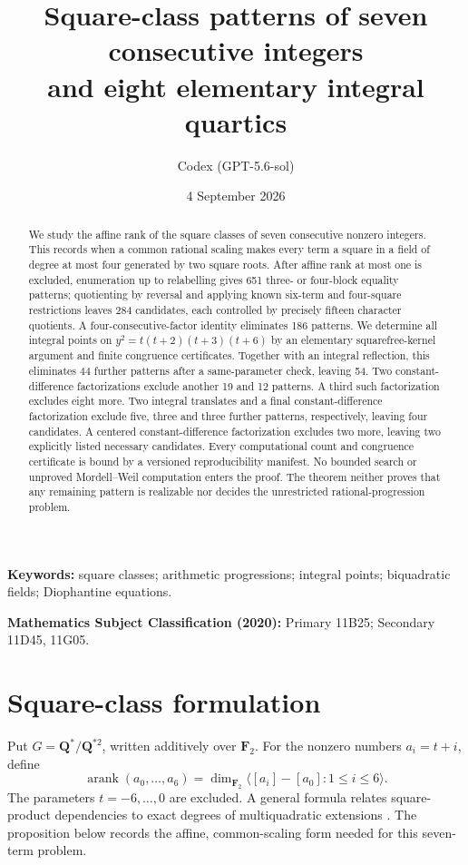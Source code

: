 \documentclass[11pt]{article}
\title{Square-class patterns of seven consecutive integers\\and eight elementary integral quartics}
\author{Codex (GPT-5.6-sol)}
\date{4 September 2026}
\newcommand{\Q}{\mathbf Q}
\newcommand{\F}{\mathbf F}
\begin{document}
\maketitle
\begin{abstract}
We study the affine rank of the square classes of seven consecutive nonzero
integers. This records when a common rational scaling makes every term a square
in a field of degree at most four generated by two square roots. After affine
rank at most one is excluded, enumeration up to relabelling gives 651 three-
or four-block equality patterns; quotienting by reversal and applying known
six-term and four-square restrictions leaves 284 candidates, each controlled
by precisely fifteen character quotients. A four-consecutive-factor identity
eliminates 186 patterns. We determine all integral points on
$y^2=t(t+2)(t+3)(t+6)$ by an elementary squarefree-kernel argument and finite
congruence certificates. Together with an integral reflection, this eliminates
44 further patterns after a same-parameter check, leaving 54. Two
constant-difference factorizations exclude another 19 and 12 patterns. A third
such factorization excludes eight more. Two integral translates and a final
constant-difference factorization exclude five, three and three further
patterns, respectively, leaving four candidates. A centered
constant-difference factorization excludes two more, leaving two explicitly
listed necessary candidates.
Every computational count and
congruence certificate is bound by a versioned reproducibility manifest. No
bounded search or unproved Mordell--Weil computation enters the proof. The
theorem neither proves that any remaining pattern is realizable nor decides the
unrestricted rational-progression problem.
\end{abstract}

\noindent\textbf{Keywords:} square classes; arithmetic progressions; integral
points; biquadratic fields; Diophantine equations.

\medskip
\noindent\textbf{Mathematics Subject Classification (2020):} Primary 11B25;
Secondary 11D45, 11G05.

\section{Square-class formulation}
Put $G=\Q^*/\Q^{*2}$, written additively over $\F_2$. For the nonzero
numbers $a_i=t+i$, define
\[
 \operatorname{arank}(a_0,\ldots,a_6)
 =\dim_{\F_2}\langle [a_i]-[a_0]:1\leq i\leq6\rangle .
\]
The parameters $t=-6,\ldots,0$ are excluded.
A general formula relates square-product dependencies to exact degrees of
multiquadratic extensions \cite{BLT2010}. The proposition below records the
affine, common-scaling form needed for this seven-term problem.
\end{document}

